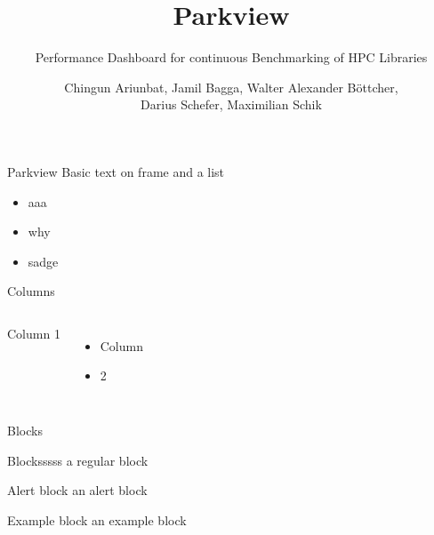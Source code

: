 \documentclass{beamer}
\title{Parkview}
\subtitle{Performance Dashboard for continuous Benchmarking of HPC Libraries}
\author{Chingun Ariunbat, Jamil Bagga, Walter Alexander B\"ottcher,\\Darius Schefer, Maximilian Schik}
\begin{document}
\maketitle

\begin{frame}{Parkview}
	Basic text on frame and a list

	\begin{itemize}
		\item{aaa}
                \item{why}
		\item{sadge}
	\end{itemize}
\end{frame}

\begin{frame}{Columns}
	\begin{columns}

		Column 1

                \begin{itemize}
                    \item Column
                    \item 2
                \end{itemize}

	\end{columns}
\end{frame}

\begin{frame}{Blocks}

	\begin{block}{Blocksssss}
	        a regular block
	\end{block}

	\begin{alertblock}{Alert block}
		an alert block
	\end{alertblock}

	\begin{exampleblock}{Example block}
		an example block
	\end{exampleblock}
\end{frame}
\end{document}
